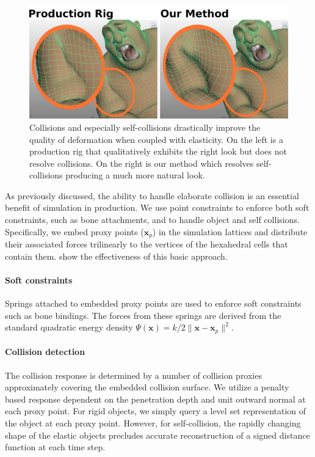 

\begin{figure}
\begin{center}
\includegraphics[width=\linewidth]{elasticity/figures/collision-figure}
\end{center}
\caption[Collisions improve deformation quality.]{Collisions and especially self-collisions drastically improve the
  quality of deformation when coupled with elasticity. On the left is a
  production rig that qualitatively exhibits the right look but does not resolve
  collisions. On the right is our method which resolves self-collisions
  producing a much more natural look.}
\label{fig:collisions}
\end{figure}

As previously discussed, the ability to handle elaborate collision is an essential benefit of simulation in production. We use point constraints to enforce both soft constraints, such as bone attachments, and to handle object and self collisions. Specifically, we embed proxy points ($\mathbf{x}_p$) in the simulation lattices and distribute their associated forces trilinearly to the vertices of the hexahedral cells that contain them. \cite{sifakis:2007:hybridsolids} show the effectiveness of this basic approach.

\paragraph{Soft constraints }
Springs attached to embedded proxy points are used to enforce soft constraints such as bone bindings. The forces from these springs are derived from the standard quadratic energy density
$\Psi(\mathbf{x}) = k/2\|\mathbf{x}-\mathbf{x}_p\|^2$.

\paragraph{Collision detection }
The collision response is determined by a number of collision proxies approximately covering the embedded collision surface. We utilize a penalty based response dependent on the penetration depth and unit outward normal at each proxy point. For rigid objects, we simply query a level set representation of the object at each proxy point. However, for self-collision, the rapidly changing shape of the elastic objects precludes accurate reconstruction of a signed distance function at each time step.


